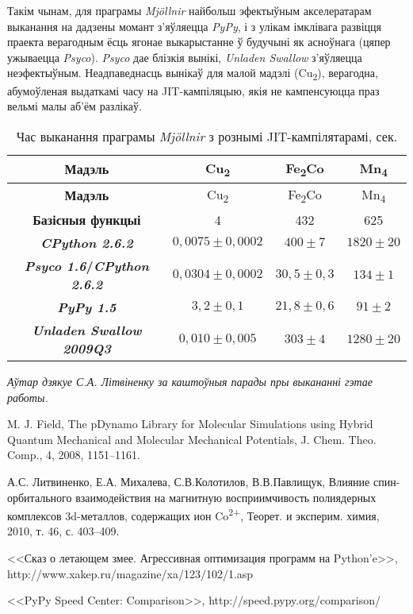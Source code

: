 \documentclass[a4paper,12pt]{article}
\newcommand{\progname}{\textit} %
\newcommand{\aknowl}{\textit} %
\begin{document}
Такім чынам, для праграмы \progname{Mj{\"o}llnir} найбольш эфектыўным акселератарам выканання на дадзены момант з'яўляецца \progname{PyPy}, і з улікам імклівага развіцця праекта верагодным ёсць ягонае выкарыстанне ў будучыні як асноўнага (цяпер ужываецца \progname{Psyco}). \progname{Psyco} дае блізкія вынікі, \progname{Unladen Swallow} з'яўляецца неэфектыўным. Неадпаведнасць вынікаў для малой мадэлі (Cu\textsubscript{2}), верагодна, абумоўленая выдаткамі часу на JIT-кампіляцыю, якія не кампенсуюцца праз вельмі малы аб'ём разлікаў.

\begin{longtable}{|>{\bfseries}c|c|c|c|}
\caption{Час выканання праграмы \progname{Mj{\"o}llnir} з рознымі JIT-кампілятарамі, сек.}\label{tab:benchmark}\\
\hline
Мадэль&Cu\textsubscript{2}&Fe\textsubscript{2}Co&Mn\textsubscript{4}\\
\hline\endfirsthead
\hline
Мадэль&Cu\textsubscript{2}&Fe\textsubscript{2}Co&Mn\textsubscript{4}\\
\hline\endhead
Базісныя функцыі&4&432&625\\
\hline
\progname{CPython 2.6.2}&$0,0075 \pm 0,0002$&$400 \pm 7$&$1820 \pm 20$\\
\hline
\progname{Psyco 1.6}/\progname{CPython 2.6.2}&$0,0304 \pm 0,0002$&$30,5 \pm 0,3$&$134 \pm 1$\\
\hline
\progname{PyPy 1.5} &$3,2 \pm 0,1$&$21,8 \pm 0,6$&$91 \pm 2$\\
\hline
\progname{Unladen Swallow 2009Q3}&$0,010 \pm 0,005$&$303 \pm 4$&$1280 \pm 20$\\
\hline
\end{longtable}

\aknowl{Аўтар дзякуе С.А. Літвіненку за каштоўныя парады пры выкананні гэтае работы.}


\begin{thebibliography}{9}

 M. J. Field, The pDynamo Library for Molecular Simulations using Hybrid Quantum Mechanical and Molecular Mechanical Potentials, J. Chem. Theo. Comp.,  4, 2008, 1151--1161.

 А.С. Литвиненко, Е.А. Михалева, С.В.Колотилов, В.В.Павлищук, Влияние спин-орбитального взаимодействия на магнитную восприимчивость полиядерных комплексов 3d-металлов, содержащих ион Co\textsuperscript{2+}, Теорет. и эксперим. химия, 2010, т. 46, с. 403--409.

 <<Сказ о летающем змее. Агрессивная оптимизация программ на Python'e>>,  http://www.xakep.ru/magazine/xa/123/102/1.asp

 <<PyPy Speed Center: Comparison>>, http://speed.pypy.org/comparison/
\end{thebibliography}
\end{document}
